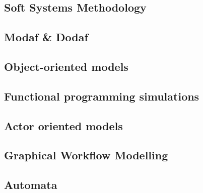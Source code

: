 \subsection{Soft Systems Methodology}


\subsection{Modaf \& Dodaf}


\subsection{Object-oriented models}


\subsection{Functional programming simulations}


\subsection{Actor oriented models}



\subsection{Graphical Workflow Modelling}



\subsection{Automata}


